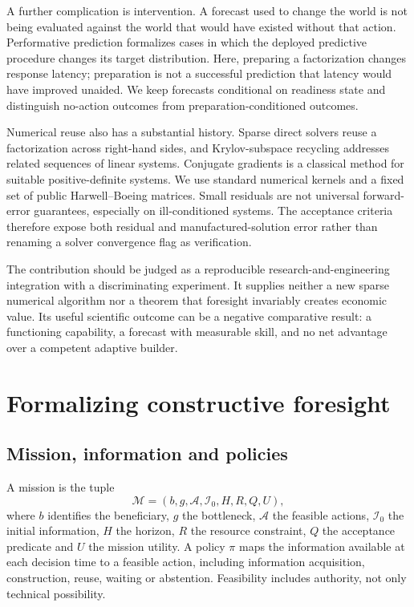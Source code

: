 \documentclass[11pt,a4paper]{article}
\begin{document}
A further complication is intervention. A forecast used to change the world is not being evaluated against the world that would have existed without that action. Performative prediction formalizes cases in which the deployed predictive procedure changes its target distribution. \citep{perdomo2020} Here, preparing a factorization changes response latency; preparation is not a successful prediction that latency would have improved unaided. We keep forecasts conditional on readiness state and distinguish no-action outcomes from preparation-conditioned outcomes.

Numerical reuse also has a substantial history. Sparse direct solvers reuse a factorization across right-hand sides, and Krylov-subspace recycling addresses related sequences of linear systems. \citep{davis2011,parks2006} Conjugate gradients is a classical method for suitable positive-definite systems. \citep{hestenes1952} We use standard numerical kernels and a fixed set of public Harwell--Boeing matrices. Small residuals are not universal forward-error guarantees, especially on ill-conditioned systems. \citep{higham2002} The acceptance criteria therefore expose both residual and manufactured-solution error rather than renaming a solver convergence flag as verification.

The contribution should be judged as a reproducible research-and-engineering integration with a discriminating experiment. It supplies neither a new sparse numerical algorithm nor a theorem that foresight invariably creates economic value. Its useful scientific outcome can be a negative comparative result: a functioning capability, a forecast with measurable skill, and no net advantage over a competent adaptive builder.

\section{Formalizing constructive foresight}
\subsection{Mission, information and policies}
A mission is the tuple
\begin{equation}
\mathcal M=(b,g,\mathcal A,\mathcal I_0,H,R,Q,U),
\end{equation}
where $b$ identifies the beneficiary, $g$ the bottleneck, $\mathcal A$ the feasible actions, $\mathcal I_0$ the initial information, $H$ the horizon, $R$ the resource constraint, $Q$ the acceptance predicate and $U$ the mission utility. A policy $\pi$ maps the information available at each decision time to a feasible action, including information acquisition, construction, reuse, waiting or abstention. Feasibility includes authority, not only technical possibility.
\end{document}
